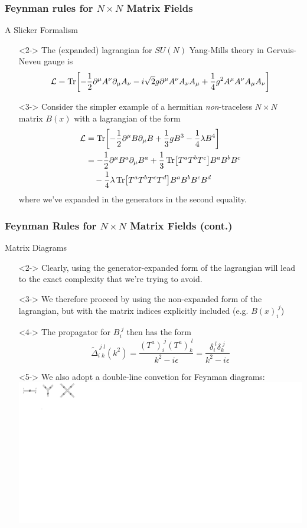 \documentclass{beamer}
\begin{document}
\begin{frame}
    \frametitle{Feynman rules for $N\times N$ Matrix Fields}
    \alert{A Slicker Formalism}
    \begin{itemize}
        \item[\textbullet]<2-> The (expanded) lagrangian for $SU(N)$ Yang-Mills theory in Gervais-Neveu gauge is \[ \mathcal{L} = \Tr[-\frac{1}{2}\partial^\mu A^\nu \partial_\mu A_\nu - i\sqrt{2}g\partial^\mu A^\nu A_\nu A_\mu + \frac{1}{4}g^2A^\mu A^\nu A_\mu A_\nu ] \]
        \item[\textbullet]<3-> Consider the simpler example of a hermitian \textit{non}-traceless $N\times N$ matrix $B(x)$ with a lagrangian of the form
        \begin{align*}
            \mathcal{L} &= \Tr[-\frac{1}{2}\partial^\mu B\partial_\mu B + \frac{1}{3}gB^3 - \frac{1}{4}\lambda B^4 ] \\
            &= -\frac{1}{2}\partial^\mu B^a \partial_\mu B^a + \frac{1}{3}\Tr[T^aT^bT^c]B^aB^bB^c \\
            &\quad - \frac{1}{4}\lambda\Tr[T^aT^bT^cT^d]B^aB^bB^cB^d
        \end{align*}
        where we've expanded in the generators in the second equality.
    \end{itemize}
\end{frame}

\begin{frame}
    \frametitle{Feynman Rules for $N\times N$ Matrix Fields (cont.)}
    \alert{Matrix Diagrams}
    \begin{itemize}
        \item[\textbullet]<2-> Clearly, using the generator-expanded form of the lagrangian will lead to the exact complexity that we're trying to avoid.
        \item[\textbullet]<3-> We therefore proceed by using the non-expanded form of the lagrangian, but with the matrix indices explicitly included (e.g. $B(x)_i^{\;j}$)
        \item[\textbullet]<4-> The propagator for $B_i^{\;j}$ then has the form \[ \tilde{\Delta}_{i\;k}^{\;j\;l}(k^2) = \frac{(T^a)_i^{\;j}(T^a)_k^{\;l}}{k^2 - i\epsilon} = \frac{\delta_i^{\;l}\delta_k^{\;j}}{k^2 - i\epsilon}\] 
        \item[\textbullet]<5-> We also adopt a double-line convetion for Feynman diagrams: 
        \includegraphics[scale=0.75]{double_line.png}
    \end{itemize}
\end{frame}
\end{document}
